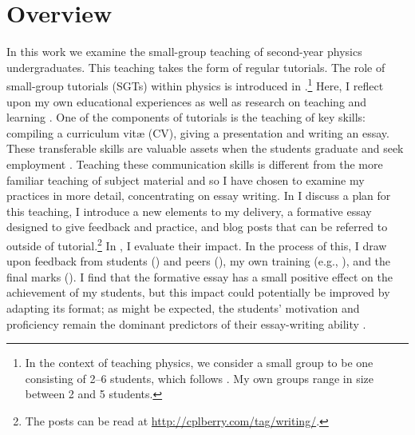 \chapter{Overview}

In this work we examine the small-group teaching of second-year physics undergraduates. This teaching takes the form of regular tutorials. The role of small-group tutorials (SGTs) within physics is introduced in .\footnote{In the context of teaching physics, we consider a small group to be one consisting of 2--6 students, which follows \citet[chapter 1]{Jaques2007}. My own groups range in size between 2 and 5 students.} Here, I reflect upon my own educational experiences as well as research on teaching and learning \citep{McCarthy2008}. One of the components of tutorials is the teaching of key skills: compiling a curriculum vit\ae{} (CV), giving a presentation and writing an essay. These transferable skills are valuable assets when the students graduate and seek employment \citep{Pike2015}. Teaching these communication skills is different from the more familiar teaching of subject material and so I have chosen to examine my practices in more detail, concentrating on essay writing. In  I discuss a plan for this teaching, I introduce a new elements to my delivery, a formative essay designed to give feedback \citep[feedforward;][]{Bloxham2015} and practice, and blog posts that can be referred to outside of tutorial.\footnote{The posts can be read at \url{http://cplberry.com/tag/writing/}.} In , I evaluate their impact. In the process of this, I draw upon feedback from students () and peers (), my own training (e.g., ), and the final marks (). I find that the formative essay has a small positive effect on the achievement of my students, but this impact could potentially be improved by adapting its format; as might be expected, the students' motivation and proficiency remain the dominant predictors of their essay-writing ability \citep{Ketteridge2015}.

